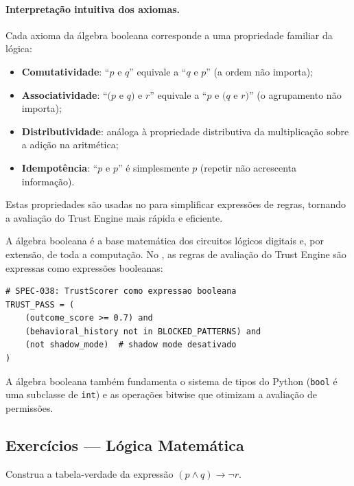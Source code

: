 \paragraph{Interpretação intuitiva dos axiomas.} Cada axioma da álgebra
booleana corresponde a uma propriedade familiar da lógica:
\begin{itemize}
    \item \textbf{Comutatividade}: ``$p$ e $q$'' equivale a ``$q$ e $p$''
          (a ordem não importa);
    \item \textbf{Associatividade}: ``$(p$ e $q)$ e $r$'' equivale a
          ``$p$ e $(q$ e $r)$'' (o agrupamento não importa);
    \item \textbf{Distributividade}: análoga à propriedade distributiva da
          multiplicação sobre a adição na aritmética;
    \item \textbf{Idempotência}: ``$p$ e $p$'' é simplesmente $p$ (repetir
          não acrescenta informação).
\end{itemize}
Estas propriedades são usadas no \opencodeeco{} para simplificar expressões
de regras, tornando a avaliação do Trust Engine mais rápida e eficiente.

A álgebra booleana é a base matemática dos circuitos lógicos digitais e,
por extensão, de toda a computação. No \opencodeeco{}, as regras de
avaliação do Trust Engine são expressas como expressões booleanas:

\begin{lstlisting}[style=pythonstyle]
# SPEC-038: TrustScorer como expressao booleana
TRUST_PASS = (
    (outcome_score >= 0.7) and
    (behavioral_history not in BLOCKED_PATTERNS) and
    (not shadow_mode)  # shadow mode desativado
)
\end{lstlisting}

\begin{observacao}
    A álgebra booleana também fundamenta o sistema de tipos do Python
    (\lstinline{bool} é uma subclasse de \lstinline{int}) e as operações
    bitwise que otimizam a avaliação de permissões.
\end{observacao}

\subsection{Exercícios — Lógica Matemática}

\begin{exercicio}[Nivel 0]
    Construa a tabela-verdade da expressão $(p \land q) \to \neg r$.
\end{exercicio}

